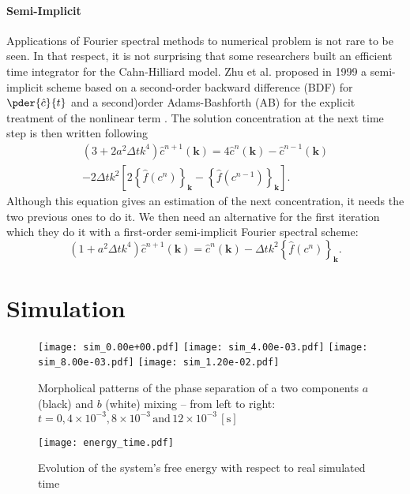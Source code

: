 \documentclass[10pt,a4paper,twocolumn]{article}
\begin{document}
\paragraph{Semi-Implicit}
Applications of Fourier spectral methods to numerical problem is not rare to be seen. In that respect, it is not surprising that some researchers built an efficient time integrator for the Cahn-Hilliard model. Zhu et al. proposed in 1999 a semi-implicit scheme based on a second-order backward  difference (BDF) for $\pder{\hat c}{t}$ and a second)order Adams-Bashforth (AB) for the explicit treatment of the nonlinear term \cite{zhu_1999}. The solution concentration at the next time step is then written following
\begin{multline}
	(3 + 2a^2 \Delta t k^4) \hat c^{n+1}(\mathbf k) = 4 \hat c^{n}(\mathbf k) - \hat c^{n-1}(\mathbf k) \\- 2 \Delta t k^2 \left[ 2 \left\{\hat f(c^n)\right\}_{\mathbf k} - \left\{\hat f(c^{n-1})\right\}_{\mathbf k} \right].
	\label{eq:dbf/ab}
\end{multline}
Although this equation gives an estimation of the next concentration, it needs the two previous ones to do it. We then need an alternative for the first iteration which they do it with a first-order semi-implicit Fourier spectral scheme:
\begin{equation}
	(1 + a^2 \Delta t k^4) \hat c^{n+1}(\mathbf k) = \hat c^{n}(\mathbf k) - \Delta t k^2 \left\{\hat f(c^n)\right\}_{\mathbf k}.
\end{equation}

\section{Simulation} %
\label{sec:simulation}
\begin{figure*}[!htpb]
	\centering
	\texttt{[image: sim\_0.00e+00.pdf]}
	\texttt{[image: sim\_4.00e-03.pdf]}
	\texttt{[image: sim\_8.00e-03.pdf]}
	\texttt{[image: sim\_1.20e-02.pdf]}
	\caption{Morpholical patterns of the phase separation of a two components $a$ (black) and $b$ (white) mixing -- from left to right: $t = 0, 4\times10^{-3}, 8\times10^{-3}\,\text{and}\, 12\times10^{-3}\, [\mathrm{s}]$}
	\label{fig:snapshots}
\end{figure*}
\begin{figure}
	\centering
	\texttt{[image: energy\_time.pdf]}
	\caption{Evolution of the system's free energy with respect to real simulated time}
	\label{fig:energy_time}
\end{figure}
\end{document}
